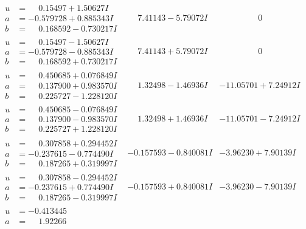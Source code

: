\documentclass[1p]{elsarticle_modified}
\theoremstyle{definition}
\begin{document}
$$\begin{array}{c|c|c}
 \hline 
\begin{aligned}
u &= \phantom{-}0.15497 + 1.50627 I \\
a &= -0.579728 + 0.885343 I \\
b &= \phantom{-}0.168592 - 0.730217 I\end{aligned}
 & \phantom{-}7.41143 - 5.79072 I & \phantom{-0.000000 } 0 \\ \hline\begin{aligned}
u &= \phantom{-}0.15497 - 1.50627 I \\
a &= -0.579728 - 0.885343 I \\
b &= \phantom{-}0.168592 + 0.730217 I\end{aligned}
 & \phantom{-}7.41143 + 5.79072 I & \phantom{-0.000000 } 0 \\ \hline\begin{aligned}
u &= \phantom{-}0.450685 + 0.076849 I \\
a &= \phantom{-}0.137900 + 0.983570 I \\
b &= \phantom{-}0.225727 - 1.228120 I\end{aligned}
 & \phantom{-}1.32498 - 1.46936 I & -11.05701 + 7.24912 I \\ \hline\begin{aligned}
u &= \phantom{-}0.450685 - 0.076849 I \\
a &= \phantom{-}0.137900 - 0.983570 I \\
b &= \phantom{-}0.225727 + 1.228120 I\end{aligned}
 & \phantom{-}1.32498 + 1.46936 I & -11.05701 - 7.24912 I \\ \hline\begin{aligned}
u &= \phantom{-}0.307858 + 0.294452 I \\
a &= -0.237615 - 0.774490 I \\
b &= \phantom{-}0.187265 + 0.319997 I\end{aligned}
 & -0.157593 - 0.840081 I & -3.96230 + 7.90139 I \\ \hline\begin{aligned}
u &= \phantom{-}0.307858 - 0.294452 I \\
a &= -0.237615 + 0.774490 I \\
b &= \phantom{-}0.187265 - 0.319997 I\end{aligned}
 & -0.157593 + 0.840081 I & -3.96230 - 7.90139 I \\ \hline\begin{aligned}
u &= -0.413445\phantom{ +0.000000I} \\
a &= \phantom{-}1.92266\phantom{ +0.000000I} \\

\end{aligned}
\end{array}$$
\end{document}
